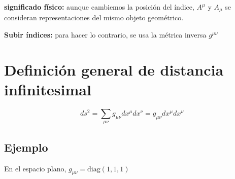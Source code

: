 \documentclass[a4paper]{article}
\begin{document}
\textbf{significado físico:} aunque cambiemos la posición del índice, $A^{\mu}$ y $A_{\mu}$ se consideran representaciones del mismo objeto geométrico.

\textbf{Subir índices:} para hacer lo contrario, se usa la métrica inversa $g^{\mu \nu}$

\section{Definición general de distancia infinitesimal}

$$ds^2 = \sum_{\mu \nu} g_{\mu \nu} dx^{\mu}dx^{\nu} = g_{\mu \nu} dx^{\mu}dx^{\nu}$$

\subsection{Ejemplo}

En el espacio plano, $g_{\mu\nu} = \text{diag}(1,1,1)$


 
\end{document}

